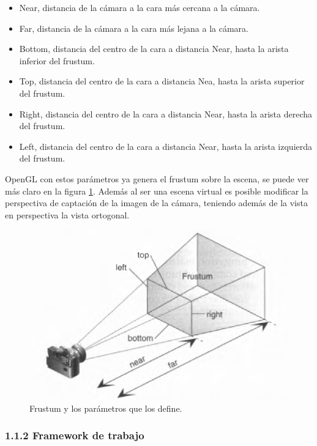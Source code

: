 \begin{itemize}
	\item Near, distancia de la cámara a la cara más cercana a la cámara.
	\item Far, distancia de la cámara a la cara más lejana a la cámara.
	\item Bottom, distancia del centro de la cara a distancia Near, hasta la arista inferior del frustum.
	\item Top, distancia del centro de la cara a distancia Nea, hasta la arista superior del frustum.
	\item Right, distancia del centro de la cara a distancia Near, hasta la arista derecha del frustum.
	\item Left, distancia del centro de la cara a distancia Near, hasta la arista izquierda del frustum.
\end{itemize}

OpenGL con estos parámetros ya genera el frustum sobre la escena, se puede ver más claro en la figura \ref{fig:frustum.png}. Además al ser una escena virtual es posible modificar la perspectiva de captación de la imagen de la cámara, teniendo además de la vista en perspectiva la vista ortogonal.

\begin{figure} %
	\centering
	\includegraphics[scale=1]{imagenes/frustum.png} 
	\caption{ Frustum y los parámetros que los define.} \label{fig:frustum.png}
\end{figure}

\subsubsection{1.1.2 Framework de trabajo}

